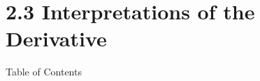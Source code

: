 

\section*{2.3 Interpretations of the Derivative}

 \begin{frame}{Table of Contents}
\mapofcontentsB{\bc}
 \end{frame}

